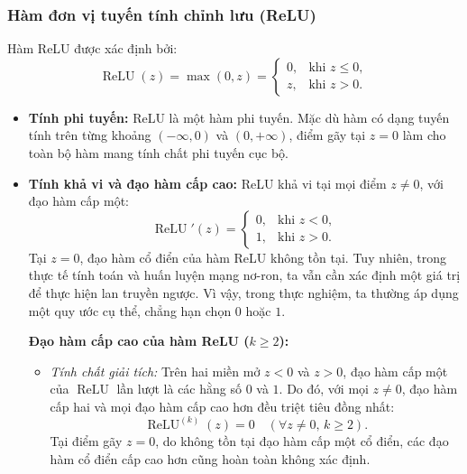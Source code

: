 \subsubsection{Hàm đơn vị tuyến tính chỉnh lưu (ReLU)}
Hàm ReLU được xác định bởi:
\begin{equation}
\operatorname{ReLU}(z) = \max(0, z) = 
\begin{cases} 
0, & \text{khi } z \leq 0, \\ 
z, & \text{khi } z > 0. 
\end{cases}
\end{equation}

\begin{itemize}
    \item \textbf{Tính phi tuyến:} ReLU là một hàm phi tuyến. Mặc dù hàm có dạng tuyến tính trên từng khoảng $(-\infty, 0)$ và $(0, +\infty)$, điểm gãy tại $z = 0$ làm cho toàn bộ hàm mang tính chất phi tuyến cục bộ.
    
    \item \textbf{Tính khả vi và đạo hàm cấp cao:} ReLU khả vi tại mọi điểm $z \neq 0$, với đạo hàm cấp một:
    \[
    \operatorname{ReLU}'(z) = 
    \begin{cases} 
    0, & \text{khi } z < 0, \\ 
    1, & \text{khi } z > 0. 
    \end{cases}
    \]
    Tại \(z=0\), đạo hàm cổ điển của hàm ReLU không tồn tại. Tuy nhiên, trong thực tế tính toán và huấn luyện mạng nơ-ron, ta vẫn cần xác định một giá trị để thực hiện lan truyền ngược. Vì vậy, trong thực nghiệm, ta thường áp dụng một quy ước cụ thể, chẳng hạn chọn \(0\) hoặc \(1\).

    \noindent\textbf{Đạo hàm cấp cao của hàm ReLU ($k \ge 2$):}
\begin{itemize}
    \item \emph{Tính chất giải tích:} Trên hai miền mở $z < 0$ và $z > 0$, đạo hàm cấp một của $\operatorname{ReLU}$ lần lượt là các hằng số $0$ và $1$. Do đó, với mọi $z \neq 0$, đạo hàm cấp hai và mọi đạo hàm cấp cao hơn đều triệt tiêu đồng nhất:
    \[
    \operatorname{ReLU}^{(k)}(z) = 0 \quad (\forall z \neq 0, \, k \ge 2).
    \]
    Tại điểm gãy $z = 0$, do không tồn tại đạo hàm cấp một cổ điển, các đạo hàm cổ điển cấp cao hơn cũng hoàn toàn không xác định.
    

\end{itemize}
\end{itemize}
